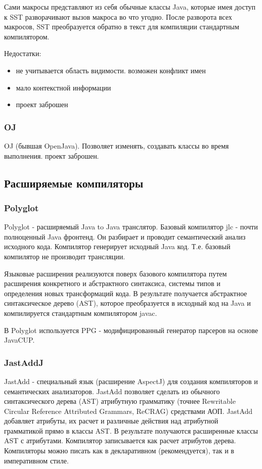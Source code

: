 \documentclass[a4paper,12pt]{article}
\begin{document}
Сами макросы представляют из себя обычные классы Java, которые имея доступ к
SST разворачивают вызов макроса во что угодно. После разворота всех макросов,
SST преобразуется обратно в текст для компиляции стандартным компилятором.

Недостатки:
\begin{itemize}
 \item не учитывается область видимости. возможен конфликт имен
 \item мало контекстной информации
 \item проект заброшен
\end{itemize}

\subsubsection{OJ}
OJ (бывшая OpenJava).
Позволяет изменять, создавать классы во время выполнения.
проект заброшен.

\subsection{Расширяемые компиляторы}
\subsubsection{Polyglot}
Polyglot - расширяемый Java to Java транслятор.
Базовый компилятор jlc - почти полноценный Java фронтенд. Он разбирает и
проводит семантический анализ исходного кода. Компилятор генерирует исходный
Java код. Т.е. базовый компилятор не производит трансляции.

Языковые расширения реализуются поверх базового компилятора путем расширения
конкретного и абстрактного синтаксиса, системы типов и определения новых
трансформаций кода. В результате получается абстрактное синтаксическое дерево
(AST), которое преобразуется в исходный код на Java и компилируется стандартным
компилятором javac.

В Polyglot используется PPG - модифицированный генератор парсеров на основе
JavaCUP.

\subsubsection{JastAddJ}
JastAdd - специальный язык (расширение AspectJ) для создания компиляторов и
семантических анализаторов. JastAdd позволяет сделать из обычного
синтаксического дерева (AST) атрибутную грамматику (точнее Rewritable Circular
Reference Attributed Grammars, ReCRAG) средствами АОП. JastAdd добавляет
атрибуты, их расчет и различные действия над атрибутной грамматикой прямо в
классы AST. В результате получаются расширенные классы AST с атрибутами.
Компилятор записывается как расчет атрибутов дерева. Компиляторы можно
писать как в декларативном (рекомендуется), так и в императивном стиле.
\end{document}
